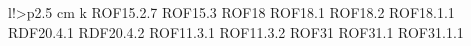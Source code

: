 \begin{tabella}{l!{\VRule}>{\centering\arraybackslash}p{2.5 cm}}
k ROF15.2.7 \linebreak ROF15.3 \linebreak ROF18 \linebreak ROF18.1 \linebreak ROF18.2 \linebreak ROF18.1.1 \linebreak RDF20.4.1 \linebreak RDF20.4.2 \linebreak ROF11.3.1 \linebreak ROF11.3.2 \linebreak ROF31 \linebreak ROF31.1 \linebreak ROF31.1.1 \li
\end{tabella}
